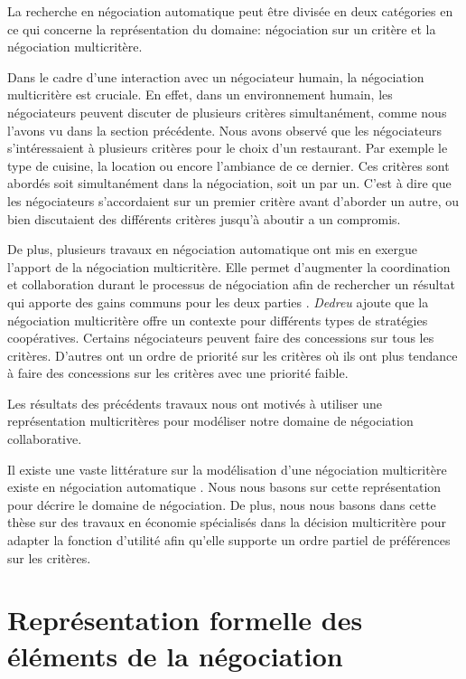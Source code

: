La recherche en négociation automatique peut être divisée en deux catégories en ce qui concerne la représentation du domaine: négociation sur un critère et la négociation multicritère.  

Dans le cadre d'une interaction avec un négociateur humain, la négociation multicritère est cruciale. En effet, dans un environnement humain, les négociateurs peuvent discuter de plusieurs critères simultanément, comme nous l'avons vu dans la section précédente.  Nous avons observé que les négociateurs s'intéressaient à plusieurs critères pour le choix d'un restaurant. Par exemple le type de cuisine, la location ou encore l'ambiance de ce dernier. Ces critères sont abordés soit simultanément dans la négociation, soit un par un. C'est à dire que les négociateurs s'accordaient sur un premier critère avant d'aborder un autre, ou bien discutaient des différents critères jusqu'à aboutir a un compromis.

De plus, plusieurs travaux en négociation automatique ont mis en exergue l'apport de la négociation multicritère. Elle permet d'augmenter la coordination et collaboration durant le processus de négociation afin de rechercher un résultat qui apporte des gains communs pour les deux parties \cite{jonker2007agent,lai2008decentralized,lai2004literature}. \emph{Dedreu} \cite{de1995impact} ajoute que la négociation multicritère offre un contexte pour différents types de stratégies coopératives. Certains négociateurs peuvent faire des concessions sur tous les critères. D'autres ont un ordre de priorité sur les critères où ils ont plus tendance à faire des concessions sur les critères avec une priorité faible. 

Les résultats des précédents travaux nous ont motivés à utiliser une représentation multicritères pour modéliser notre domaine de négociation collaborative. 

Il existe une vaste littérature sur la modélisation d'une négociation multicritère existe en négociation automatique \cite{jonker2007agent,lai2008decentralized,lai2004literature,hindriks2008opponent,traum2008multi}. Nous nous basons sur cette représentation pour décrire le domaine de négociation.
De plus, nous nous basons dans cette thèse sur des travaux en économie spécialisés dans la décision multicritère \cite{greco2016multiple} pour adapter la fonction d'utilité afin qu'elle supporte un ordre partiel de préférences sur les critères.


\section{Représentation formelle des éléments de la négociation}

